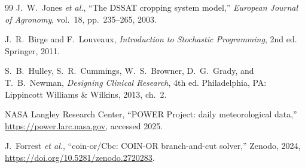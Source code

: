 \documentclass[10pt,twocolumn]{article}
\begin{document}
\begin{thebibliography}{99}
J.~W.~Jones \textit{et al.},
``The DSSAT cropping system model,'' \textit{European Journal of Agronomy},
vol.~18, pp.~235--265, 2003.

J.~R.~Birge and F.~Louveaux,
\textit{Introduction to Stochastic Programming}, 2nd ed. Springer, 2011.


S.~B.~Hulley, S.~R.~Cummings, W.~S.~Browner, D.~G.~Grady, and T.~B.~Newman,
\textit{Designing Clinical Research}, 4th ed. Philadelphia, PA: Lippincott
Williams \& Wilkins, 2013, ch.~2.

NASA Langley Research Center, ``POWER Project: daily meteorological data,''
\url{https://power.larc.nasa.gov}, accessed 2025.

J.~Forrest \textit{et al.}, ``coin-or/Cbc: COIN-OR branch-and-cut solver,''
Zenodo, 2024, \url{https://doi.org/10.5281/zenodo.2720283}.

\end{thebibliography}
\end{document}
